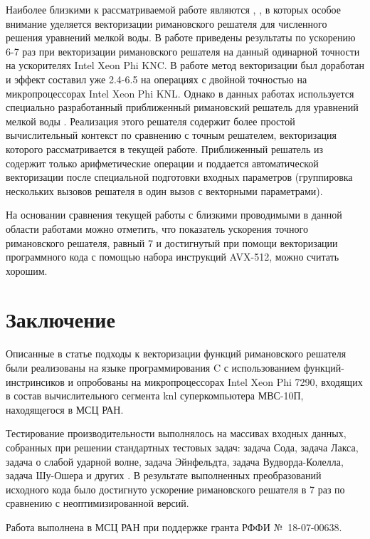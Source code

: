 \documentclass[utf8]{psta}
\begin{document}
Наиболее близкими к рассматриваемой работе являются \cite{BaderSWEVect}, \cite{FerreiraSWEVect}, в которых особое внимание уделяется векторизации римановского решателя для численного решения уравнений мелкой воды.
В работе \cite{BaderSWEVect} приведены результаты по ускорению 6-7 раз при векторизации римановского решателя на данный одинарной точности на ускорителях Intel Xeon Phi KNC.
В работе \cite{FerreiraSWEVect} метод векторизации был доработан и эффект составил уже 2.4-6.5 на операциях с двойной точностью на микропроцессорах Intel Xeon Phi KNL.
Однако в данных работах используется специально разработанный приближенный римановский решатель для уравнений мелкой воды \cite{George}.
Реализация этого решателя содержит более простой вычислительный контекст по сравнению с точным решателем, векторизация которого рассматривается в текущей работе.
Приближенный решатель из \cite{George} содержит только арифметические операции и поддается автоматической векторизации после специальной подготовки входных параметров (группировка нескольких вызовов решателя в один вызов с векторными параметрами).

На основании сравнения текущей работы с близкими проводимыми в данной области работами можно отметить, что показатель ускорения точного римановского решателя, равный 7 и достигнутый при помощи векторизации программного кода с помощью набора инструкций AVX-512, можно считать хорошим.

\section*{Заключение}

Описанные в статье подходы к векторизации функций римановского решателя были реализованы на языке программирования C с использованием функций-инстринсиков и опробованы на микропроцессорах Intel Xeon Phi 7290, входящих в состав вычислительного сегмента knl суперкомпьютера МВС-10П, находящегося в МСЦ РАН.

Тестирование производительности выполнялось на массивах входных данных, собранных при решении стандартных тестовых задач: задача Сода, задача Лакса, задача о слабой ударной волне, задача Эйнфельдта, задача Вудворда-Колелла, задача Шу-Ошера и других \cite{BulVolTest}.
В результате выполненных преобразований исходного кода было достигнуто ускорение римановского решателя в 7 раз по сравнению с неоптимизированной версий.

Работа выполнена в МСЦ РАН при поддержке гранта РФФИ №~18-07-00638. 
\end{document}
